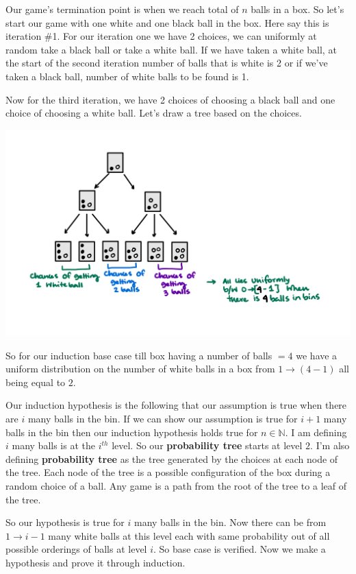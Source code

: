 \documentclass[addpoints,12pt]{exam}
\begin{document}
\begin{questions}
\begin{solution}
            Our game's termination point is when we reach total of $n$ balls in a box. So let's start our game with one white and one black ball in the box. Here say this is iteration \#1. For our iteration one we have 2 choices, we can uniformly at random take a black ball or take a white ball. If we have taken a white ball, at the start of the second iteration number of balls that is white is 2 or if we've taken a black ball, number of white balls to be found is 1.

            Now for the third iteration, we have 2 choices of choosing a black ball and one choice of choosing a white ball. Let's draw a tree based on the choices.

            \includegraphics[scale=0.27]{ballsnbins}

            So for our induction base case till box having a number of balls $= 4$ we have a uniform distribution on the number of white balls in a box from $1 \to (4-1)$ all being equal to $2$.

            Our induction hypothesis is the following that our assumption is true when there are $i$ many balls in the bin. If we can show our assumption is true for $i+1$ many balls in the bin then our induction hypothesis holds true for $n \in \mathbb{N}$. I am defining $i$ many balls is at the $i^{th}$ level. So our \textbf{probability tree} starts at level $2$. I'm also defining \textbf{probability tree} as the tree generated by the choices at each node of the tree. Each node of the tree is a possible configuration of the box during a random choice of a ball. Any game is a path from the root of the tree to a leaf of the tree.

            So our hypothesis is true for $i$ many balls in the bin. Now there can be from $1 \to i-1$ many white balls at this level each with same probability out of all possible orderings of balls at level $i$. So base case is verified. Now we make a hypothesis and prove it through induction.
            

\end{solution}
\end{questions}
\end{document}
